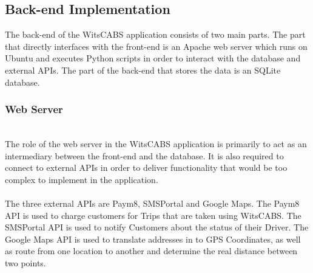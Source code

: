 \documentclass[10pt, onecolumn]{witseiepaper}
\begin{document}
\subsection{Back-end Implementation}
The back-end of the WitsCABS application consists of two main parts. The part that directly interfaces with the front-end is an Apache web server which runs on Ubuntu and executes Python scripts in order to interact with the database and external APIs. The part of the back-end that stores the data is an SQLite database.

\subsubsection{Web Server}\mbox{}\\
The role of the web server in the WitsCABS application is primarily to act as an intermediary between the front-end and the database. It is also required to connect to external APIs in order to deliver functionality that would be too complex to implement in the application.\\ \\
The three external APIs are Paym8, SMSPortal and Google Maps. The Paym8 API is used to charge customers for Trips that are taken using WitsCABS. The SMSPortal API is used to notify Customers about the status of their Driver. The Google Maps API is used to translate addresses in to GPS Coordinates, as well as route from one location to another and determine the real distance between two points.
\end{document}
